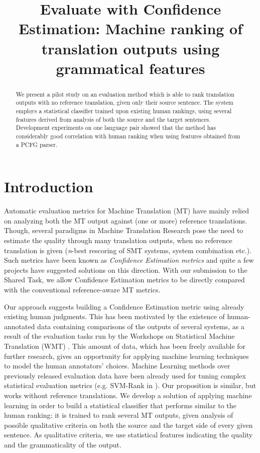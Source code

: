 \documentclass[11pt]{article}
\title{Evaluate with Confidence Estimation: Machine ranking of translation
outputs using grammatical features}
\date{}
\begin{document}
\maketitle
\begin{abstract}
We present a pilot study on an evaluation method which is able to rank 
translation outputs with no reference translation, given only their source sentence. The
system employs a statistical classifier trained upon existing human rankings, 
using several features derived from analysis of both the source and the target
sentences. Development experiments on one language pair showed that the method
has considerably good correlation with human ranking when using features
obtained from a PCFG parser.
  
\end{abstract}

\section{Introduction}
Automatic evaluation metrics for Machine Translation (MT) have mainly relied on
analyzing both the MT output against (one or more) reference translations.
Though, several paradigms in Machine Translation Research pose the need to
estimate the quality through many translation outputs, when no reference
translation is given (\textit{n}-best rescoring of SMT systems, system
combination etc.). Such metrics have been known as \textit{Confidence
Estimation metrics} and quite a few projects have suggested solutions on this direction. With our submission to the Shared Task,
we allow Confidence Estimation metrics to be directly compared
with the conventional reference-aware MT metrics.

Our approach suggests building a Confidence Estimation metric using
already existing human judgments. This has been motivated by the existence
of human-annotated data containing comparisons of the outputs of several
systems, as a result of the evaluation tasks run by the Workshops on
Statistical Machine Translation
(\textsc{WMT})
\cite{callisonburch-EtAl:2008:WMT,callisonburch-EtAl:2009:WMT-09,callisonburch-EtAl:2010:WMT}. 
This amount of data, which has been freely available for further research, gives
an opportunity for applying machine learning techniques to model the human
annotators' choices. Machine Learning methods over previously released 
evaluation data have been already used for tuning complex
statistical evaluation metrics (e.g. SVM-Rank in
\cite{callisonburch-EtAl:2010:WMT}). %
Our proposition is similar, but works without reference translations. 
We develop a solution of applying machine learning in order to build a
statistical classifier that performs similar to the human ranking: it is trained
to rank several MT outputs, given analysis of possible qualitative criteria on
both the source and the target side of every given sentence. As qualitative
criteria, we use statistical features indicating the quality and
the grammaticality of the output.
\end{document}

